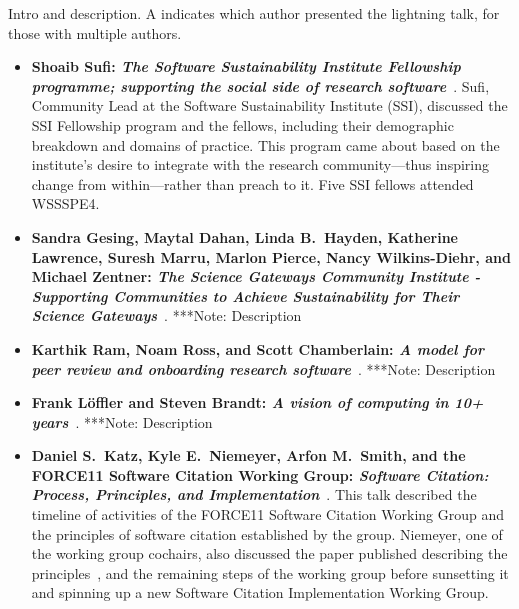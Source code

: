 \documentclass[11pt, oneside]{amsart}
\newcommand{\note}[1]{ {\textcolor{blueish}    { ***Note:      #1 }}}
\begin{document}
Intro and description.
A \textsuperscript{\textasteriskcentered} indicates which author presented the
lightning talk, for those with multiple authors.
%
\begin{itemize}
    \item \textbf{Shoaib Sufi: \emph{The Software Sustainability Institute Fellowship
    programme; supporting the social side of research software}}~\cite{Sufi:2016ws}.
    Sufi, Community Lead at the Software Sustainability Institute (SSI), discussed
    the SSI Fellowship program and the fellows, including their
    demographic breakdown and domains of practice. This program came about
    based on the institute's desire to integrate with the research community---thus
    inspiring change from within---rather than preach to it. Five SSI fellows
    attended WSSSPE4.

    \item \textbf{Sandra Gesing, Maytal Dahan, Linda B.~Hayden, Katherine Lawrence,
    Suresh Marru, Marlon Pierce, Nancy Wilkins-Diehr, and Michael Zentner:
    \emph{The Science Gateways Community Institute - Supporting Communities to
    Achieve Sustainability for Their Science Gateways}}~\cite{Gesing:2016ws}.
    \note{Description}

    \item \textbf{Karthik Ram\textsuperscript{\textasteriskcentered}, Noam Ross,
    and Scott Chamberlain: \emph{A model for
    peer review and onboarding research software}}~\cite{Ram:2016ws}.
    \note{Description}

    \item \textbf{Frank L\"{o}ffler and Steven Brandt\textsuperscript{\textasteriskcentered}:
    \emph{A vision of computing in 10+ years}}~\cite{Loffler:2016ws}.
    \note{Description}

    \item \textbf{Daniel S.~Katz, Kyle E.~Niemeyer\textsuperscript{\textasteriskcentered},
    Arfon M.~Smith, and the FORCE11 Software Citation Working Group:
    \emph{Software Citation: Process, Principles, and Implementation}}~\cite{Katz:2016ws}.
    This talk described the timeline of activities of the FORCE11 Software Citation
    Working Group and the principles of software citation established by the group.
    Niemeyer, one of the working group cochairs, also discussed the paper published
    describing the principles~\cite{Smith:2016sc}, and the remaining steps of the
    working group before sunsetting it and spinning up a new Software Citation
    Implementation Working Group.


\end{itemize}
\end{document}
